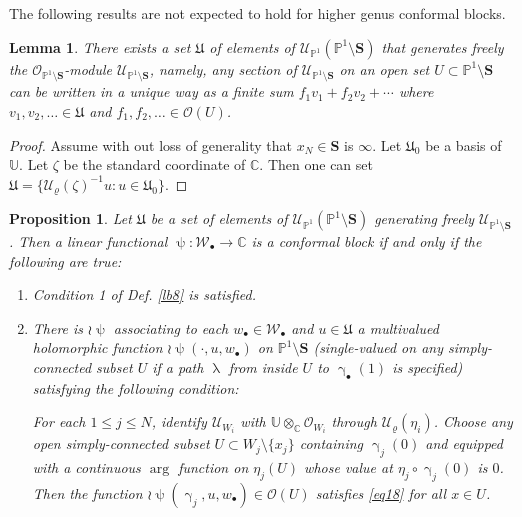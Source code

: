 \documentclass[12pt,a4paper,notitlepage]{article}
\theoremstyle{definition}
\theoremstyle{plain}
\newtheorem{pp}[df]{Proposition}
\newtheorem{lm}[df]{Lemma}
\newcommand{\fk}{\mathfrak}
\newcommand{\mc}{\mathcal}
\newcommand{\scr}{\mathscr}
\newcommand{\blt}{\bullet}
\newcommand{\Ubb}{\mathbb U}
\newcommand{\Cbb}{\mathbb C}
\newcommand{\Pbb}{\mathbb P}
\newcommand{\Sbf}{\mathbf{S}}
\numberwithin{equation}{subsection}
\begin{document}

The following results are not expected to hold for higher genus conformal blocks.

\begin{lm}\label{lb53}
There exists a set $\fk U$ of elements of $\scr U_{\Pbb^1}(\Pbb^1\setminus\Sbf)$ that generates freely the $\scr O_{\Pbb^1\setminus\Sbf}$-module $\scr U_{\Pbb^1\setminus\Sbf}$, namely, any section of $\scr U_{\Pbb^1\setminus\Sbf}$ on an open set $U\subset\Pbb^1\setminus\Sbf$ can be written in a unique way as a finite sum $f_1v_1+f_2v_2+\cdots$ where $v_1,v_2,\dots\in\fk U$ and $f_1,f_2,\dots\in\scr O(U)$.
\end{lm}


\begin{proof}
Assume with out loss of generality that $x_N\in\Sbf$ is $\infty$. Let $\fk U_0$ be a basis of $\Ubb$. Let $\zeta$ be the standard coordinate of $\Cbb$. Then one can set $\fk U=\{\mc U_\varrho(\zeta)^{-1}u:u\in\fk U_0\}$.
\end{proof}










\begin{pp}\label{lb11}
Let $\fk U$ be a set of elements of $\scr U_{\Pbb^1}(\Pbb^1\setminus\Sbf)$ generating freely  $\scr U_{\Pbb^1\setminus\Sbf}$. Then a linear functional $\uppsi:\mc W_\blt\rightarrow\Cbb$ is a conformal block if and only if the following are true:
\begin{enumerate}
\item Condition 1 of Def. \ref{lb8} is satisfied.
\item There is $\wr\uppsi$ associating to each $w_\blt\in\mc W_\blt$ and $u\in\fk U$ a multivalued holomorphic function $\wr\uppsi(\cdot,u,w_\blt)$ on $\Pbb^1\setminus\Sbf$ (single-valued on any simply-connected subset $U$ if a path $\uplambda$ from inside $U$ to $\upgamma_\blt(1)$ is specified)  satisfying the following condition: 

For each $1\leq j\leq N$,  identify $\scr U_{W_i}$ with $\Ubb\otimes_\Cbb\scr O_{W_i}$ through $\mc U_\varrho(\eta_i)$.  Choose   any open simply-connected subset $U\subset W_j\setminus\{x_j\}$ containing $\upgamma_j(0)$ and equipped with a continuous $\arg$ function on $\eta_j(U)$ whose value at $\eta_j\circ\upgamma_j(0)$ is $0$. Then the function $\wr\uppsi(\upgamma_j,u,w_\blt)\in\scr O(U)$ satisfies \eqref{eq18} for all $x\in U$.
\end{enumerate}

\end{pp}
\end{document}
